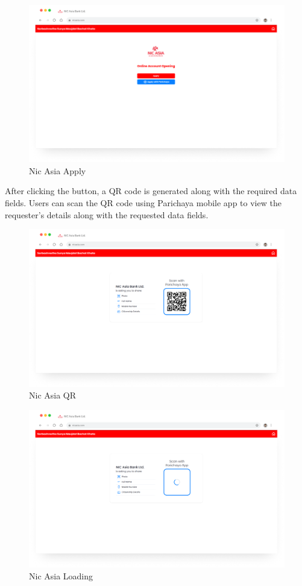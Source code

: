         \begin{figure}[H]
        \centering
        \includegraphics[width=0.8\linewidth]{images/results/web/NICApply.png}
        \caption[Nic Asia Apply]{Nic Asia Apply}
        \label{fig:NICApply.png}
        \end{figure}
    After clicking the button, a QR code is generated along with the required data fields. Users can scan the QR code using Parichaya mobile app to view the requester's details along with the requested data fields. 
        \begin{figure}[H]
        \centering
        \includegraphics[width=0.8\linewidth]{images/results/web/NICQR.png}
        \caption[Nic Asia QR]{Nic Asia QR}
        \label{fig:NICQR.png}
        \end{figure}
         \begin{figure}[H]
        \centering
        \includegraphics[width=0.8\linewidth]{images/results/web/NICLoading.png}
        \caption[Nic Asia Loading]{Nic Asia Loading}
        \label{fig:NICLoading.png}
        \end{figure}
